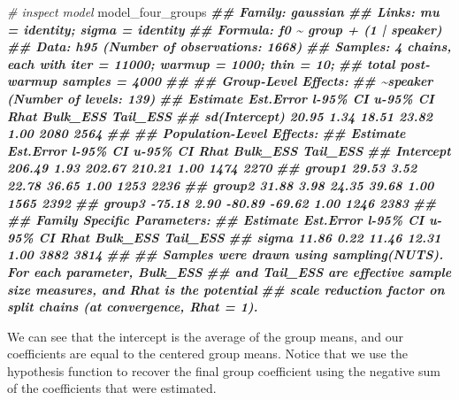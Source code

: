 \documentclass[
]{book}
\newenvironment{Shaded}{\begin{snugshade}}{\end{snugshade}}
\newcommand{\CommentTok}[1]{\textcolor[rgb]{0.56,0.35,0.01}{\textit{#1}}}
\newcommand{\DocumentationTok}[1]{\textcolor[rgb]{0.56,0.35,0.01}{\textbf{\textit{#1}}}}
\newcommand{\NormalTok}[1]{#1}
\begin{document}
\begin{Shaded}
\begin{Highlighting}[]
\CommentTok{\# inspect model}
\NormalTok{model\_four\_groups}
\DocumentationTok{\#\#  Family: gaussian }
\DocumentationTok{\#\#   Links: mu = identity; sigma = identity }
\DocumentationTok{\#\# Formula: f0 \textasciitilde{} group + (1 | speaker) }
\DocumentationTok{\#\#    Data: h95 (Number of observations: 1668) }
\DocumentationTok{\#\# Samples: 4 chains, each with iter = 11000; warmup = 1000; thin = 10;}
\DocumentationTok{\#\#          total post{-}warmup samples = 4000}
\DocumentationTok{\#\# }
\DocumentationTok{\#\# Group{-}Level Effects: }
\DocumentationTok{\#\# \textasciitilde{}speaker (Number of levels: 139) }
\DocumentationTok{\#\#               Estimate Est.Error l{-}95\% CI u{-}95\% CI Rhat Bulk\_ESS Tail\_ESS}
\DocumentationTok{\#\# sd(Intercept)    20.95      1.34    18.51    23.82 1.00     2080     2564}
\DocumentationTok{\#\# }
\DocumentationTok{\#\# Population{-}Level Effects: }
\DocumentationTok{\#\#           Estimate Est.Error l{-}95\% CI u{-}95\% CI Rhat Bulk\_ESS Tail\_ESS}
\DocumentationTok{\#\# Intercept   206.49      1.93   202.67   210.21 1.00     1474     2270}
\DocumentationTok{\#\# group1       29.53      3.52    22.78    36.65 1.00     1253     2236}
\DocumentationTok{\#\# group2       31.88      3.98    24.35    39.68 1.00     1565     2392}
\DocumentationTok{\#\# group3      {-}75.18      2.90   {-}80.89   {-}69.62 1.00     1246     2383}
\DocumentationTok{\#\# }
\DocumentationTok{\#\# Family Specific Parameters: }
\DocumentationTok{\#\#       Estimate Est.Error l{-}95\% CI u{-}95\% CI Rhat Bulk\_ESS Tail\_ESS}
\DocumentationTok{\#\# sigma    11.86      0.22    11.46    12.31 1.00     3882     3814}
\DocumentationTok{\#\# }
\DocumentationTok{\#\# Samples were drawn using sampling(NUTS). For each parameter, Bulk\_ESS}
\DocumentationTok{\#\# and Tail\_ESS are effective sample size measures, and Rhat is the potential}
\DocumentationTok{\#\# scale reduction factor on split chains (at convergence, Rhat = 1).}
\end{Highlighting}
\end{Shaded}

We can see that the intercept is the average of the group means, and our coefficients are equal to the centered group means. Notice that we use the hypothesis function to recover the final group coefficient using the negative sum of the coefficients that were estimated.
\end{document}
